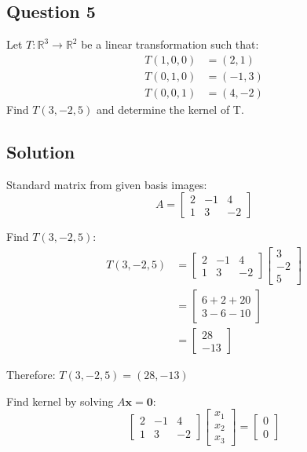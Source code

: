 \documentclass[12pt]{article}
\begin{document}
\subsection*{Question 5}
Let $T : \mathbb{R}^{3} \rightarrow \mathbb{R}^{2}$ be a linear transformation such that:
\begin{align*}
T(1,0,0) &= (2,1) \\
T(0,1,0) &= (-1,3) \\
T(0,0,1) &= (4,-2)
\end{align*}
Find $T(3,-2,5)$ and determine the kernel of T.

\subsection*{Solution}

Standard matrix from given basis images:
\[
	A = \begin{bmatrix}
		2 & -1 & 4 \\
		1 & 3 & -2
	\end{bmatrix}
\]

Find $T(3,-2,5)$:
\begin{align*}
	T(3,-2,5) &= \begin{bmatrix}
		2 & -1 & 4 \\
		1 & 3 & -2
	\end{bmatrix} \begin{bmatrix}
		3 \\ -2 \\ 5
	\end{bmatrix} \\
	&= \begin{bmatrix}
		6 + 2 + 20 \\
		3 - 6 - 10
	\end{bmatrix} \\
	&= \begin{bmatrix}
		28 \\ -13
	\end{bmatrix}
\end{align*}

Therefore: $T(3,-2,5) = (28, -13)$

Find kernel by solving $A\mathbf{x} = \mathbf{0}$:
\[
	\begin{bmatrix}
		2 & -1 & 4 \\
		1 & 3 & -2
	\end{bmatrix} \begin{bmatrix}
		x_1 \\ x_2 \\ x_3
	\end{bmatrix} = \begin{bmatrix}
		0 \\ 0
	\end{bmatrix}
\]
\end{document}
